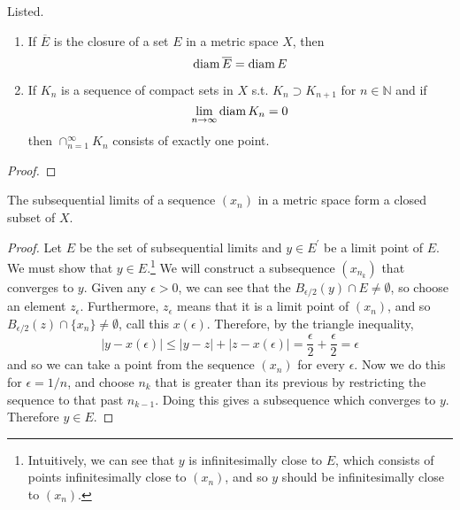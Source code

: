   \begin{theorem}
    Listed. 
    \begin{enumerate}
      \item If $\overline{E}$ is the closure of a set $E$ in a metric space $X$, then 
      \begin{equation}
        \operatorname{diam}{\overline{E}} = \operatorname{diam}{E}
      \end{equation}

      \item If $K_n$ is a sequence of compact sets in $X$ s.t. $K_n \supset K_{n+1}$ for $n \in \mathbb{N}$ and if 
      \begin{equation}
        \lim_{n \rightarrow \infty} \operatorname{diam}{K_n} = 0
      \end{equation}
      then $\cap_{n=1}^\infty K_n$ consists of exactly one point. 
    \end{enumerate}
  \end{theorem}
  \begin{proof}
    
  \end{proof}
  
  \begin{theorem}
    The subsequential limits of a sequence $(x_n)$ in a metric space form a closed subset of $X$. 
  \end{theorem}
  \begin{proof}
    Let $E$ be the set of subsequential limits and $y \in E^\prime$ be a limit point of $E$. We must show that $y \in E$.\footnote{Intuitively, we can see that $y$ is infinitesimally close to $E$, which consists of points infinitesimally close to $(x_n)$, and so $y$ should be infinitesimally close to $(x_n)$.} We will construct a subsequence $(x_{n_k})$ that converges to $y$. Given any $\epsilon > 0$, we can see that the $B_{\epsilon/2} (y) \cap E \neq \emptyset$, so choose an element $z_\epsilon$. Furthermore, $z_\epsilon$ means that it is a limit point of $(x_n)$, and so $B_{\epsilon/2} (z) \cap \{x_n\} \neq \emptyset$, call this $x(\epsilon)$. Therefore, by the triangle inequality, 
    \begin{equation}
      |y - x(\epsilon)| \leq |y - z| + |z - x(\epsilon)| = \frac{\epsilon}{2} + \frac{\epsilon}{2} = \epsilon
    \end{equation}
    and so we can take a point from the sequence $(x_n)$ for every $\epsilon$. Now we do this for $\epsilon = 1/n$, and choose $n_k$ that is greater than its previous by restricting the sequence to that past $n_{k-1}$. Doing this gives a subsequence which converges to $y$. Therefore $y \in E$. 
  \end{proof}

